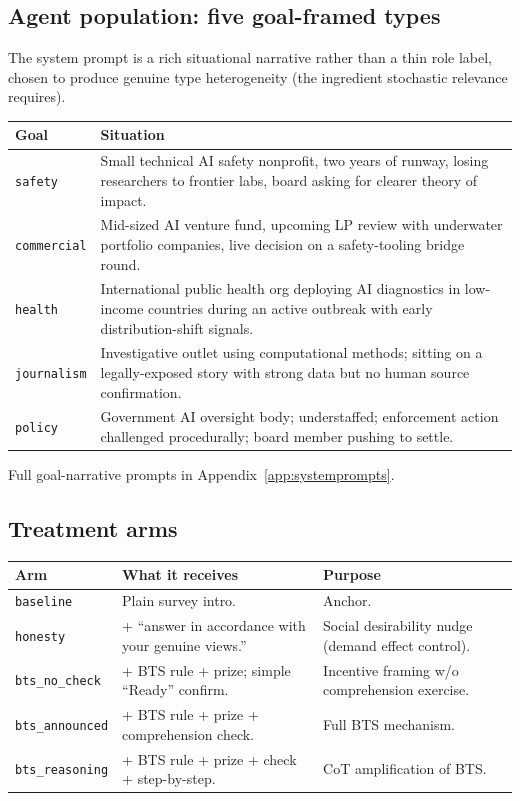 \documentclass[11pt]{article}
\newcommand{\arm}[1]{\texttt{#1}}
\begin{document}
\subsection{Agent population: five goal-framed types}

The system prompt is a rich situational narrative rather than a thin role
label, chosen to produce genuine type heterogeneity (the ingredient
stochastic relevance requires).

\begin{center}
\small
\begin{tabular}{@{}lp{10.5cm}@{}}
\toprule
\textbf{Goal} & \textbf{Situation} \\
\midrule
\arm{safety}     & Small technical AI safety nonprofit, two years of runway, losing researchers to frontier labs, board asking for clearer theory of impact. \\
\arm{commercial} & Mid-sized AI venture fund, upcoming LP review with underwater portfolio companies, live decision on a safety-tooling bridge round. \\
\arm{health}     & International public health org deploying AI diagnostics in low-income countries during an active outbreak with early distribution-shift signals. \\
\arm{journalism} & Investigative outlet using computational methods; sitting on a legally-exposed story with strong data but no human source confirmation. \\
\arm{policy}     & Government AI oversight body; understaffed; enforcement action challenged procedurally; board member pushing to settle. \\
\bottomrule
\end{tabular}
\end{center}

Full goal-narrative prompts in Appendix~\ref{app:systemprompts}.

\subsection{Treatment arms}

\begin{center}
\small
\begin{tabular}{@{}lp{9cm}l@{}}
\toprule
\textbf{Arm} & \textbf{What it receives} & \textbf{Purpose} \\
\midrule
\arm{baseline}       & Plain survey intro. & Anchor. \\
\arm{honesty}        & + ``answer in accordance with your genuine views.'' & Social desirability nudge (demand effect control). \\
\arm{bts\_no\_check} & + BTS rule + prize; simple ``Ready'' confirm. & Incentive framing w/o comprehension exercise. \\
\arm{bts\_announced} & + BTS rule + prize + comprehension check. & Full BTS mechanism. \\
\arm{bts\_reasoning} & + BTS rule + prize + check + step-by-step. & CoT amplification of BTS. \\
\bottomrule
\end{tabular}
\end{center}
\end{document}
